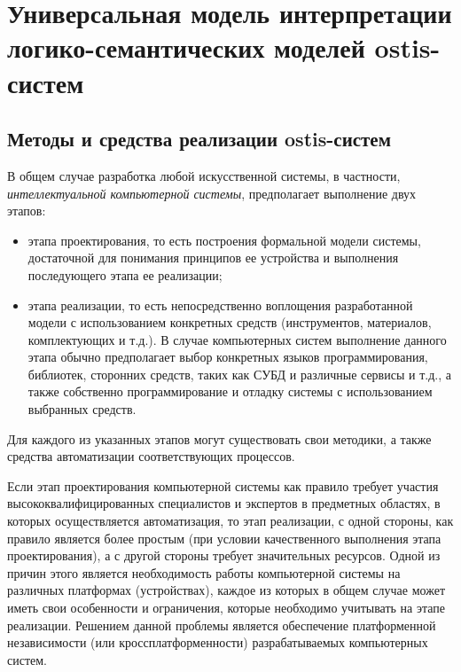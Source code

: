 \chapter{Универсальная модель интерпретации логико-семантических моделей ostis-систем}
\label{chapter_interpreter}


\section{Методы и средства реализации ostis-систем}

В общем случае разработка любой искусственной системы, в частности, \textit{интеллектуальной компьютерной системы}, предполагает выполнение двух этапов:
\begin{itemize}
	\item этапа проектирования, то есть построения формальной модели системы, достаточной для понимания принципов ее устройства и выполнения последующего этапа ее реализации;
	\item этапа реализации, то есть непосредственно воплощения разработанной модели с использованием конкретных средств (инструментов, материалов, комплектующих и т.д.). В случае компьютерных систем выполнение данного этапа обычно предполагает выбор конкретных языков программирования, библиотек, сторонних средств, таких как СУБД и различные сервисы и т.д., а также собственно программирование и отладку системы с использованием выбранных средств.
\end{itemize}

Для каждого из указанных этапов могут существовать свои методики, а также средства автоматизации соответствующих процессов.

Если этап проектирования компьютерной системы как правило требует участия высококвалифицированных специалистов и экспертов в предметных областях, в которых осуществляется автоматизация, то этап реализации, с одной стороны, как правило является более простым (при условии качественного выполнения этапа проектирования), а с другой стороны требует значительных ресурсов. Одной из причин этого является необходимость работы компьютерной системы на различных платформах (устройствах), каждое из которых в общем случае может иметь свои особенности и ограничения, которые необходимо учитывать на этапе реализации. Решением данной проблемы является обеспечение платформенной независимости (или кроссплатформенности) разрабатываемых компьютерных систем.

